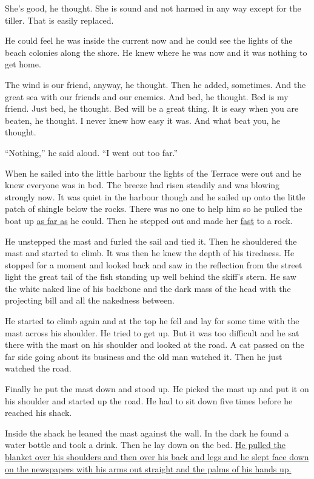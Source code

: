 She's good, he thought. She is sound and not harmed in any way except for
the tiller. That is easily replaced.

He could feel he was inside the current now and he could see the lights of
the beach \gls{colonies} along the shore. He knew where he was now and it
was nothing to get home.

The wind is our friend, anyway, he thought. Then he \gls{added},
sometimes. And the great sea with our friends and our enemies. And bed, he
thought. Bed is my friend. Just bed, he thought. Bed will be a great thing.
It is easy when you are beaten, he thought. I never knew how easy it was.
And what beat you, he thought.

``Nothing,'' he said aloud. ``I went out too far.''

When he sailed into the little harbour the lights of the Terrace were out
and he knew everyone was in bed. The breeze had risen steadily and was
blowing strongly now. It was quiet in the harbour though and he sailed up
onto the little patch of \gls{shingle} below the \glspl{rock}. There was no
one to help him so he pulled the boat up \uline{as far as} he could. Then he stepped
out and made her \uline{fast} to a rock.

He unstepped the mast and furled the sail and tied it. Then he shouldered
the mast and started to climb. It was then he knew the depth of his
\gls{tiredness}. He stopped for a moment and looked back and saw in the
reflection from the street light the great tail of the fish standing up well
behind the skiff's stern. He saw the white naked line of his backbone and
the dark mass of the head with the projecting bill and all the
\gls{nakedness} between.

He started to climb again and at the top he fell and lay for some time with
the mast across his shoulder. He tried to get up. But it was too difficult
and he sat there with the mast on his shoulder and looked at the road. A
cat passed on the far side going about its business and the old man watched
it. Then he just watched the road.

Finally he put the mast down and stood up. He picked the mast up and put it
on his shoulder and started up the road. He had to sit down five times
before he reached his shack.

Inside the shack he leaned the mast against the wall. In the dark he found a
water bottle and took a drink. Then he lay down on the bed. \uline{He pulled the
blanket over his shoulders and then over his back and legs and he slept face
down on the newspapers with his arms out straight and the palms of his hands
up.}

